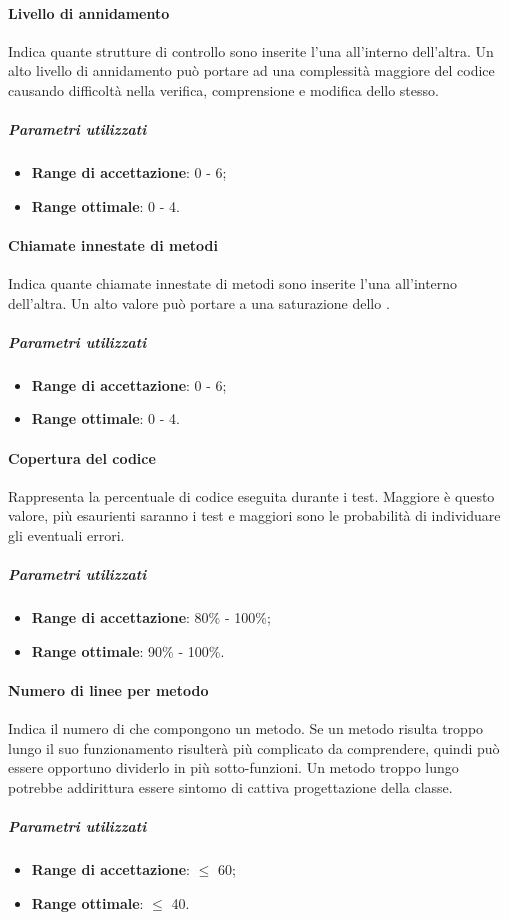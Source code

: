 \documentclass[../PianoDiQualifica.tex]{subfiles}
\begin{document}
				\paragraph{Livello di annidamento\\}
					Indica quante strutture di controllo sono inserite l'una all'interno
					dell'altra. Un alto livello di annidamento può portare ad una
					complessità maggiore del codice causando difficoltà nella verifica,
					comprensione e modifica dello stesso.
					\subparagraph{Parametri utilizzati}
						\begin{itemize}
							\item \textbf{Range di accettazione}: 0 - 6;
							\item \textbf{Range ottimale}: 0 - 4.
						\end{itemize}
				\paragraph{Chiamate innestate di metodi\\}
					Indica quante chiamate innestate di metodi sono inserite l'una
					all'interno dell'altra. Un alto valore può portare a una saturazione
					dello .
					\subparagraph{Parametri utilizzati}
						\begin{itemize}
							\item \textbf{Range di accettazione}: 0 - 6;
							\item \textbf{Range ottimale}: 0 - 4.
						\end{itemize}
				\paragraph{Copertura del codice\\}
					Rappresenta la percentuale di codice eseguita durante i test.
					Maggiore è questo valore, più esaurienti saranno i test e maggiori
					sono le probabilità di individuare gli eventuali errori.
					\subparagraph{Parametri utilizzati}
						\begin{itemize}
							\item \textbf{Range di accettazione}: 80\% - 100\%;
							\item \textbf{Range ottimale}: 90\% - 100\%.
						\end{itemize}
				\paragraph{Numero di linee per metodo\\}
					Indica il numero di  che compongono un metodo.
					Se un metodo risulta troppo lungo il suo funzionamento risulterà più
					complicato da comprendere, quindi può essere opportuno dividerlo in
					più sotto-funzioni. Un metodo troppo lungo potrebbe addirittura essere
					sintomo di cattiva progettazione della classe.
					\subparagraph{Parametri utilizzati}
						\begin{itemize}
							\item \textbf{Range di accettazione}: $\leq$ 60;
							\item \textbf{Range ottimale}: $\leq$ 40.
						\end{itemize}
\end{document}
